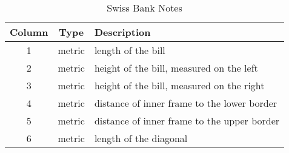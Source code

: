 \begin{table}[!h]
    \caption{Swiss Bank Notes}
    \begin{center}
        \begin{tabular}{|c|c|l|}
            \hline
            Column & Type   & Description \\
            \hline
            1 & metric & length of the bill\\
            2 & metric & height of the bill, measured on the left \\
            3 & metric & height of the bill, measured on the right \\
            4 & metric & distance of inner frame to the lower border \\
            5 & metric & distance of inner frame to the upper border \\
            6 & metric & length of the diagonal\\
            \hline
        \end{tabular}
    \end{center}
\end{table}
